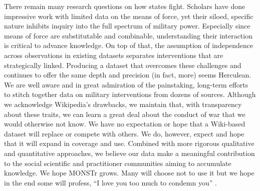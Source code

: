 \documentclass[fleqn,12pt]{article}
\begin{document}
There remain many research questions on how states fight. Scholars have done impressive work with limited data on the means of force, yet their siloed, specific nature inhibits inquiry into the full spectrum of military power. Especially since means of force are substitutable and combinable, understanding their interaction is critical to advance knowledge. On top of that, the assumption of independence across observations in existing datasets separates interventions that are strategically linked. Producing a dataset that overcomes these challenges and continues to offer the same depth and precision (in fact, more) seems Herculean. We are well aware and in great admiration of the painstaking, long-term efforts to stitch together data on military interventions from dozens of sources. Although we acknowledge Wikipedia's drawbacks, we maintain that, with transparency about these traits, we can learn a great deal about the conduct of war that we would otherwise not know. We have no expectation or hope that a Wiki-based dataset will replace or compete with others. We do, however, expect and hope that it will expand in coverage and use. Combined with more rigorous qualitative and quantitative approaches, we believe our data make a meaningful contribution to the social scientific and practitioner communities aiming to accumulate knowledge. We hope MONSTr grows. Many will choose not to use it but we hope in the end some will profess, ``I love you too much to condemn you” \citep{dracula}.

\newpage
\end{document}
